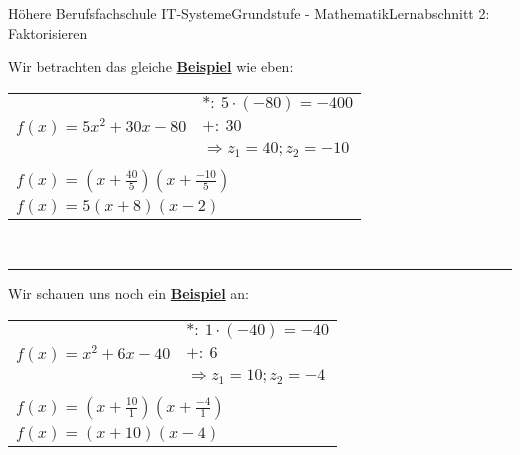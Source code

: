 \documentclass[11pt,twocolumn,oneside,openany,headings=optiontotoc,11pt,numbers=noenddot]{article}
\begin{document}
\begin{worksheet}{Höhere Berufsfachschule IT-Systeme}{Grundstufe - Mathematik}{Lernabschnitt 2: Faktorisieren}
\begin{itemize}
		\end{itemize}
		Wir betrachten das gleiche \underline{\textbf{Beispiel}} wie eben:\\
		\par\noindent
		\begin{tabularx}{0.5\textwidth}{X|l}
			\cline{2-2}
			& \(*:\ 5\cdot(-80)=-400\)\\
			\(f(x) = 5x^2 + 30x -80\) & \(+:\ 30\)\\
			& \(\Rightarrow z_1 = 40; z_2 = -10\)\\
			\cline{2-2}
			\multicolumn{2}{l}{}\\
			\multicolumn{2}{l}{\(f(x) = (x+\frac{40}{5})(x+\frac{-10}{5})\)}\\
			\multicolumn{2}{l}{\(f(x) = 5(x+8)(x-2)\)}
		\end{tabularx}\\
		\par\noindent
		\rule{0.45\textwidth}{0.1pt}
		Wir schauen uns noch ein \underline{\textbf{Beispiel}} an:\\
		\par\noindent
		\begin{tabularx}{0.5\textwidth}{X|l}
			\cline{2-2}
			& \(*:\ 1\cdot(-40)=-40\)\\
			\(f(x) = x^2 + 6x - 40\) & \(+:\ 6\)\\
			& \(\Rightarrow z_1 = 10; z_2 = -4\)\\
			\cline{2-2}
			\multicolumn{2}{l}{}\\
			\multicolumn{2}{l}{\(f(x) = (x+\frac{10}{1})(x+\frac{-4}{1})\)}\\
			\multicolumn{2}{l}{\(f(x) = (x+10)(x-4)\)}\\
		\end{tabularx}

\end{worksheet}
\end{document}
